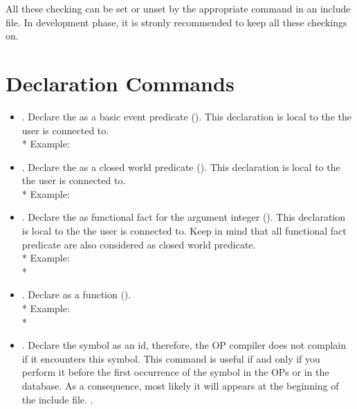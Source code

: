 All these checking can be set or unset by the appropriate command in an include
file. In development phase, it is stronly recommended to keep all these checkings
on.

\section{\CPK{} Declaration Commands}

\begin{itemize}

\item {}. Declare the  as a basic
event predicate (). This declaration is local to the
\CPK{} the user is connected to.\\*
Example: 

\item {}. Declare the  as a closed
world predicate (). This declaration is local to
the \CPK{} the user is connected to. \\*
Example: 

\item {}. Declare the
 as functional fact for the argument integer (). This declaration is local to the \CPK{} the user is connected
to. Keep in mind that all functional fact predicate are also considered as
closed world predicate.\\*
Example: \\*

\item {}. Declare  as a
function ().\\*
Example: \\*

\item {}. Declare the symbol as an id, therefore, the OP
compiler does not complain if it encounters this symbol. This command is
useful if and only if you perform it before the first occurrence of the
symbol in the OPs or in the database. As a consequence, most likely it
will appears at the beginning of the include file. .


\end{itemize}
